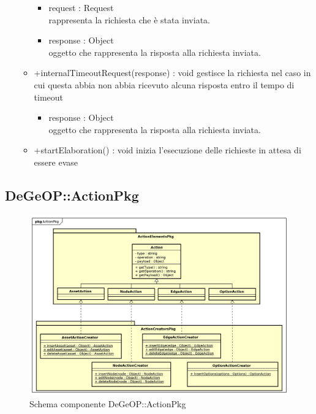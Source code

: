 \begin{itemize}
\begin{itemize}
		\begin{itemize}
			\item request : Request\\
			rappresenta la richiesta che è stata inviata.
			\item response : Object\\
			oggetto che rappresenta la risposta alla richiesta inviata.
		\end{itemize}
		\item +internalTimeoutRequest(response) : void\newline
		gestisce la richiesta nel caso in cui questa abbia non abbia ricevuto alcuna risposta entro il tempo di timeout
		\begin{itemize}
			\item response : Object\\
			oggetto che rappresenta la risposta alla richiesta inviata.
		\end{itemize}
		\item +startElaboration() : void\newline
		inizia l'esecuzione delle richieste in attesa di essere evase
	\end{itemize}
\end{itemize}
\newpage
\subsection{DeGeOP::ActionPkg}
\label{pkg::ActionPkg}
\begin{figure}[H]
	\centering
	\includegraphics[width=\textwidth]{img/PkgDiagram/ActionPkg.png}
	\caption{Schema componente DeGeOP::ActionPkg}
\end{figure}
